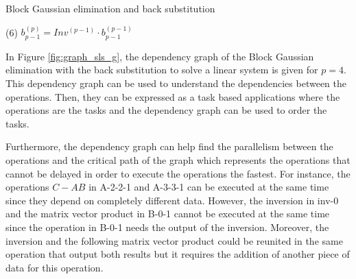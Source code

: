\begin{algorithm}[h]
	\DontPrintSemicolon
	\caption{Block Gaussian elimination and back substitution \label{alg:bg_el_block_colo}}

	(6) {\color{magenta} $b_{p-1}^{(p)} = Inv^{(p-1)} \cdot b_{p-1}^{(p-1)}$} \;

\end{algorithm}

In Figure \ref{fig:graph_sls_g}, the dependency graph of the Block Gaussian elimination with the back substitution to solve a linear system is given for $p = 4$.
This dependency graph can be used to understand the dependencies between the operations.
Then, they can be expressed as a task based applications where the operations are the tasks and the dependency graph can be used to order the tasks.

Furthermore, the dependency graph can help find the parallelism between the operations and the critical path of the graph which represents the operations that cannot be delayed in order to execute the operations the fastest.
For instance, the operations $C-AB$ in A-2-2-1 and A-3-3-1 can be executed at the same time since they depend on completely different data.
However, the inversion in inv-0 and the matrix vector product in B-0-1 cannot be executed at the same time since the operation in B-0-1 needs the output of the inversion.
Moreover, the inversion and the following matrix vector product could be reunited in the same operation that output both results but it requires the addition of another piece of data for this operation.

